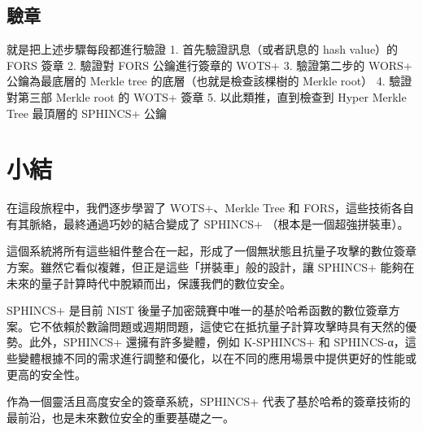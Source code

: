\documentclass[
]{article}
\begin{document}
\hypertarget{ux9a57ux7ae0}{%
\subsection{驗章}\label{ux9a57ux7ae0}}

就是把上述步驟每段都進行驗證 1. 首先驗證訊息（或者訊息的 hash value）的
FORS 簽章 2. 驗證對 FORS 公鑰進行簽章的 WOTS+ 3. 驗證第二步的 WORS+
公鑰為最底層的 Merkle tree 的底層（也就是檢查該棵樹的 Merkle root） 4.
驗證對第三部 Merkle root 的 WOTS+ 簽章 5. 以此類推，直到檢查到 Hyper
Merkle Tree 最頂層的 SPHINCS+ 公鑰

\hypertarget{ux5c0fux7d50}{%
\section{小結}\label{ux5c0fux7d50}}

在這段旅程中，我們逐步學習了 WOTS+、Merkle Tree 和
FORS，這些技術各自有其脈絡，最終通過巧妙的結合變成了 SPHINCS+
（根本是一個超強拼裝車）。

這個系統將所有這些組件整合在一起，形成了一個無狀態且抗量子攻擊的數位簽章方案。雖然它看似複雜，但正是這些「拼裝車」般的設計，讓
SPHINCS+ 能夠在未來的量子計算時代中脫穎而出，保護我們的數位安全。

SPHINCS+ 是目前 NIST
後量子加密競賽中唯一的基於哈希函數的數位簽章方案。它不依賴於數論問題或週期問題，這使它在抵抗量子計算攻擊時具有天然的優勢。此外，SPHINCS+
還擁有許多變體，例如 K-SPHINCS+ 和
SPHINCS-α，這些變體根據不同的需求進行調整和優化，以在不同的應用場景中提供更好的性能或更高的安全性。

作為一個靈活且高度安全的簽章系統，SPHINCS+
代表了基於哈希的簽章技術的最前沿，也是未來數位安全的重要基礎之一。
\end{document}
